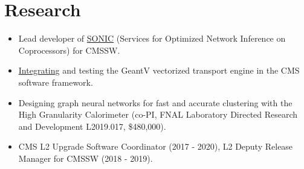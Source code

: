 \section{Research}
\begin{itemize}[leftmargin=12pt]
\item Lead developer of \href{https://github.com/hls-fpga-machine-learning/SonicCMS/}{SONIC} (Services for Optimized Network Inference on Coprocessors) for CMSSW.
\item \href{https://github.com/kpedro88/SimGVCore}{Integrating} and testing the GeantV vectorized transport engine in the CMS software framework.
\item Designing graph neural networks for fast and accurate clustering with the High Granularity Calorimeter (co-PI, FNAL Laboratory Directed Research and Development L2019.017, \$480,000).
\item CMS L2 Upgrade Software Coordinator (2017 - 2020), L2 Deputy Release Manager for CMSSW (2018 - 2019).
\end{itemize}
